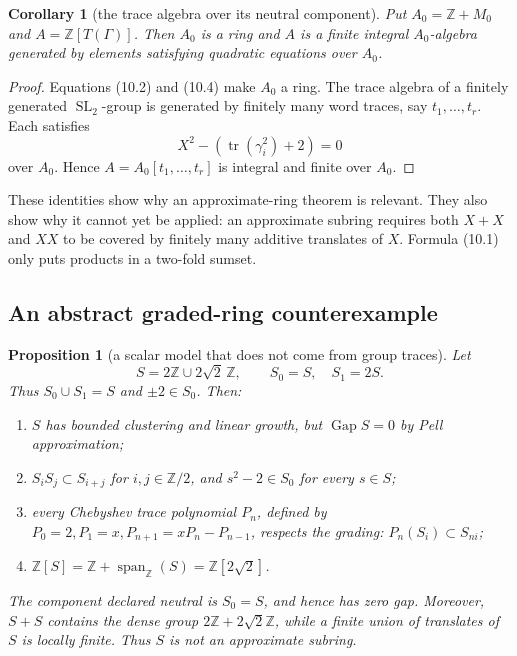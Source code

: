 \documentclass[11pt,reqno]{amsart}
\newtheorem{proposition}[theorem]{Proposition}
\newtheorem{corollary}[theorem]{Corollary}
\theoremstyle{definition}
\theoremstyle{remark}
\newcommand{\Z}{\mathbb Z}
\newcommand{\Tr}{\operatorname{tr}}
\newcommand{\Gap}{\operatorname{Gap}}
\newcommand{\Span}{\operatorname{span}}
\newcommand{\SL}{\operatorname{SL}}
\begin{document}
\begin{corollary}[the trace algebra over its neutral component]\label{cor:finite-kummer-algebra}
Put \(A_0=\Z+M_0\) and
\(A=\Z[T(\Gamma)]\).  Then \(A_0\) is a ring and \(A\) is a finite integral
\(A_0\)-algebra generated by elements satisfying quadratic equations over
\(A_0\).
\end{corollary}

\begin{proof}
Equations (10.2) and (10.4) make \(A_0\) a ring.  The trace algebra of a
finitely generated \(\SL_2\)-group is generated by finitely many word traces,
say \(t_1,\ldots,t_r\).  Each satisfies
\[
 X^2-(\Tr(\gamma_i^2)+2)=0
\]
over \(A_0\).  Hence
\(A=A_0[t_1,\ldots,t_r]\) is integral and finite over \(A_0\).
\end{proof}

These identities show why an approximate-ring theorem is relevant.  They also
show why it cannot yet be applied: an approximate subring requires both
\(X+X\) and \(XX\) to be covered by finitely many additive translates of
\(X\).  Formula (10.1) only puts products in a two-fold sumset.

\subsection{An abstract graded-ring counterexample}

\begin{proposition}[a scalar model that does not come from group traces]\label{prop:scalar-countermodel}
Let
\[
 S=2\Z\cup2\sqrt2\,\Z,
 \qquad S_0=S,\quad S_1=2S.
\tag{10.6}
\]
Thus \(S_0\cup S_1=S\) and \(\pm2\in S_0\).  Then:
\begin{enumerate}[label=\textup{(\roman*)}]
\item \(S\) has bounded clustering and linear growth, but \(\Gap S=0\) by
Pell approximation;
\item \(S_iS_j\subset S_{i+j}\) for \(i,j\in\Z/2\), and
\(s^2-2\in S_0\) for every \(s\in S\);
\item every Chebyshev trace polynomial \(P_n\), defined by
\(P_0=2,P_1=x,P_{n+1}=xP_n-P_{n-1}\), respects the grading:
\(P_n(S_i)\subset S_{ni}\);
\item \(\Z[S]=\Z+\Span_\Z(S)=\Z[2\sqrt2]\).
\end{enumerate}
The component declared neutral is \(S_0=S\), and hence has zero gap.  Moreover,
\(S+S\) contains the dense group \(2\Z+2\sqrt2\Z\), while a finite union of
translates of \(S\) is locally finite.  Thus \(S\) is not an approximate
subring.
\end{proposition}
\end{document}
